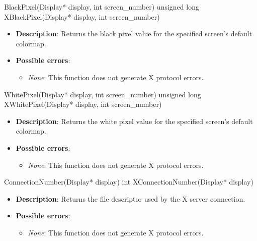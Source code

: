 \documentclass{report}
\begin{document}
\begin{itemize}
        \begin{cppcode}
            BlackPixel(Display* display, int screen_number) 
            unsigned long XBlackPixel(Display* display, int screen_number)
        \end{cppcode}
        \begin{itemize}
            \item \textbf{Description}: Returns the black pixel value for the specified screen's default colormap.
            \item \textbf{Possible errors}:
                \begin{itemize}
                    \item \textit{None}: This function does not generate X protocol errors.
                \end{itemize}
        \end{itemize}

        \begin{cppcode}
            WhitePixel(Display* display, int screen_number)
            unsigned long XWhitePixel(Display* display, int screen_number)
        \end{cppcode}
        \begin{itemize}
            \item \textbf{Description}: Returns the white pixel value for the specified screen's default colormap.
            \item \textbf{Possible errors}:
                \begin{itemize}
                    \item \textit{None}: This function does not generate X protocol errors.
                \end{itemize}
        \end{itemize}

        \begin{cppcode}
            ConnectionNumber(Display* display)
            int XConnectionNumber(Display* display)
        \end{cppcode}
        \begin{itemize}
            \item \textbf{Description}: Returns the file descriptor used by the X server connection.
            \item \textbf{Possible errors}:
                \begin{itemize}
                    \item \textit{None}: This function does not generate X protocol errors.
                \end{itemize}
        \end{itemize}


\end{itemize}
\end{document}
